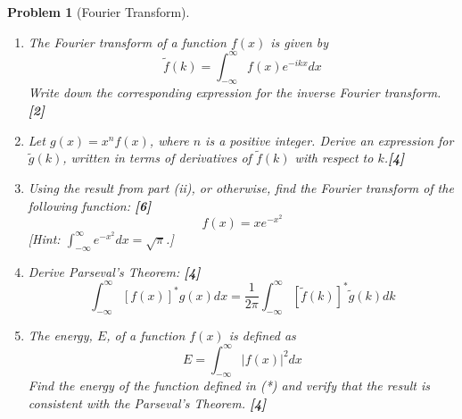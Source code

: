 \documentclass[a4paper]{article}
\theoremstyle{new}
\newtheorem{qns}{Problem}[section]
\begin{document}
\newpage
\begin{qns}[Fourier Transform]\leavevmode
\begin{enumerate}[label=(\roman*)]
\item The Fourier transform of a function $f(x)$ is given by
$$\tilde{f}(k)=\int_{-\infty}^\infty f(x)e^{-ikx}dx$$
Write down the corresponding expression for the inverse Fourier transform.\hfill \textbf{[2]}
\item Let $g(x)=x^nf(x)$, where $n$ is a positive integer. Derive an expression for $\tilde{g}(k)$, written in terms of derivatives of $\tilde{f}(k)$ with respect to $k$.\hfill \textbf{[4]}
\item Using the result from part (ii), or otherwise, find the Fourier transform of the following function: \hfill \textbf{[6]}
\begin{equation}
    f(x)=xe^{-x^2}\tag{*}
\end{equation}
[Hint: $\int_{-\infty}^\infty e^{-x^2}dx=\sqrt{\pi}$.]
\item Derive Parseval's Theorem: \hfill \textbf{[4]}
$$\int_{-\infty}^\infty[f(x)]^*g(x)dx=\frac{1}{2\pi}\int_{-\infty}^\infty[\tilde{f}(k)]^*\tilde{g}(k)dk$$
\item The energy, $E$, of a function $f(x)$ is defined as
$$E=\int_{-\infty}^\infty |f(x)|^2dx$$
Find the energy of the function defined in (*) and verify that the result is consistent with the Parseval's Theorem. \hfill \textbf{[4]}
\end{enumerate}
\end{qns}
\end{document}
